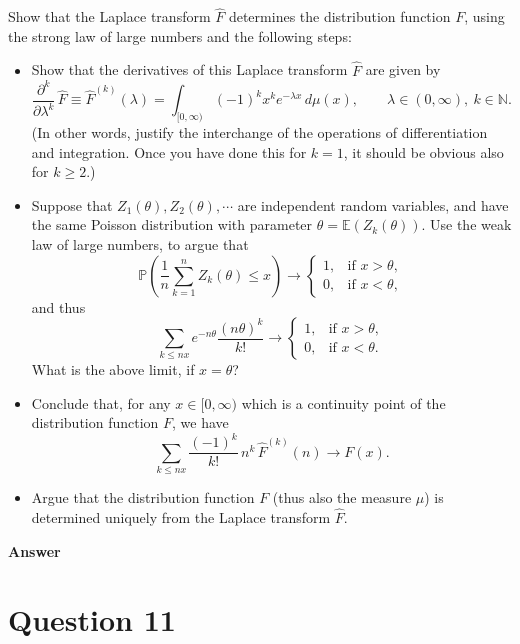 \documentclass[letterpaper]{article}
\begin{document}
		Show that the Laplace transform $\widehat{F}$ determines the distribution function $F$, using the strong law of large numbers and the following steps:
		\begin{itemize}
			\item[(a)] Show that the derivatives of this Laplace transform $\widehat{F}$ are given by
			\[
			\frac{\partial^k}{\partial\lambda^k}\,\widehat{F}\equiv \widehat{F}^{(k)}(\lambda)=\int_{[0,\infty)}(-1)^k x^k e^{-\lambda x}\,d\mu(x), \qquad \lambda\in(0,\infty),\ k\in\mathbb{N}.
			\]
			(In other words, justify the interchange of the operations of differentiation and integration. Once you have done this for $k=1$, it should be obvious also for $k\ge 2$.)
			
			\item[(b)] Suppose that $Z_1(\theta),Z_2(\theta),\cdots$ are independent random variables, and have the same Poisson distribution with parameter $\theta=\mathbb{E}(Z_k(\theta))$. Use the weak law of large numbers, to argue that
			\[
			\mathbb{P}\left(\frac{1}{n}\sum_{k=1}^n Z_k(\theta)\le x\right)\longrightarrow
			\begin{cases}
				1, & \text{if } x>\theta,\\
				0, & \text{if } x<\theta,
			\end{cases}
			\]
			and thus
			\[
			\sum_{k\le nx} e^{-n\theta}\frac{(n\theta)^k}{k!}\longrightarrow
			\begin{cases}
				1, & \text{if } x>\theta,\\
				0, & \text{if } x<\theta.
			\end{cases}
			\]
			What is the above limit, if $x=\theta$?
			
			\item[(c)] Conclude that, for any $x\in[0,\infty)$ which is a continuity point of the distribution function $F$, we have
			\[
			\sum_{k\le nx}\frac{(-1)^k}{k!}\,n^k\,\widehat{F}^{(k)}(n)\longrightarrow F(x).
			\]
			
			\item[(d)] Argue that the distribution function $F$ (thus also the measure $\mu$) is determined uniquely from the Laplace transform $\widehat{F}$.
		\end{itemize}
	
	
		
		\textbf{Answer}
		
		\clearpage
		
		\section{Question 11}
		
\end{document}
